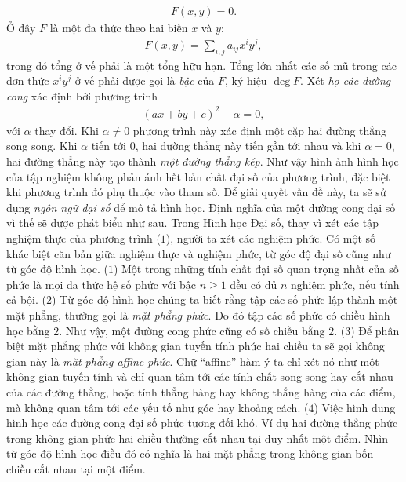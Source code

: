 \begin{multicols}{2}
	\begin{align*}
		F(x,y)=0. \tag{$1$}
	\end{align*}
	Ở đây $F$ là một đa thức theo hai biến $x$ và $y$:
	\begin{align*}
		F(x,y)=\sum_{i,j} a_{ij}x^iy^j,
	\end{align*}
	trong đó tổng ở vế phải là một tổng hữu hạn. Tổng lớn nhất các số mũ trong các đơn thức $x^iy^j$ ở vế phải được gọi là {\em bậc} của $F$, ký hiệu $\deg F$. 
	\vskip 0.1cm
	Xét {\em họ các đường cong} xác định bởi phương trình
	\begin{align*}
		(ax+by+c)^2-\alpha=0,
	\end{align*}
	với $\alpha$ thay đổi. Khi $\alpha\neq 0$ phương trình này xác định một cặp hai đường thẳng song song. Khi $\alpha$ tiến tới $0$, hai đường thẳng này tiến gần tới nhau và khi $\alpha=0$, hai đường thẳng này tạo thành {\em một đường thẳng kép}. 
	\vskip 0.1cm
	Như vậy hình ảnh hình học của tập nghiệm không phản ánh hết bản chất đại số của phương trình, đặc biệt khi phương trình đó phụ thuộc vào tham số. Để giải quyết vấn đề này, ta sẽ sử dụng {\em ngôn ngữ đại số} để mô tả hình học. Định nghĩa của một đường cong đại số vì thế sẽ được phát biểu như sau. 
	\vskip 0.1cm
	\vskip 0.1cm
	Trong Hình học Đại số, thay vì xét các tập nghiệm thực của phương trình ($1$), người ta xét các nghiệm phức. Có một số khác biệt căn bản giữa nghiệm thực và nghiệm phức, từ góc độ đại số cũng như từ góc độ hình học. 
	\vskip 0.1cm
	($1$) Một trong những tính chất đại số quan trọng nhất của số phức là mọi đa thức hệ số phức với bậc $n\geq 1$ đều có đủ $n$ nghiệm phức, nếu tính cả bội.   
	\vskip 0.1cm 
	($2$) Từ góc độ hình học chúng ta biết rằng tập các số phức lập thành một mặt phẳng, thường gọi là {\em mặt phẳng phức}. Do đó tập các số phức có chiều hình học bằng $2$. Như vậy, một đường cong phức cũng có số chiều bằng $2$. 
	\vskip 0.1cm
	($3$) Để phân biệt mặt phẳng phức với không gian tuyến tính phức hai chiều ta sẽ gọi không gian này là {\em mặt phẳng affine phức}. Chữ ``affine'' hàm ý ta chỉ xét nó như một không gian tuyến tính và chỉ quan tâm tới các tính chất song song hay cắt nhau của các đường thẳng, hoặc tính thẳng hàng hay không thẳng hàng của các điểm, mà không quan tâm tới các yếu tố như góc hay khoảng cách. 
	\vskip 0.1cm
	($4$) Việc hình dung hình học các đường cong đại số phức tương đối khó. Ví dụ hai đường thẳng phức trong không gian phức hai chiều thường cắt nhau tại duy nhất một điểm. Nhìn từ góc độ hình học điều đó có nghĩa là hai mặt phẳng trong không gian bốn chiều cắt nhau tại một điểm. 

\end{multicols}
